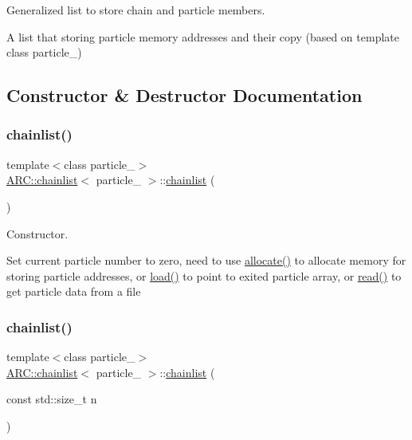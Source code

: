 Generalized list to store chain and particle members. 

A list that storing particle memory addresses and their copy (based on template class particle\+\_\+) 

\subsection{Constructor \& Destructor Documentation}
\hypertarget{classARC_1_1chainlist_a12641a795a63d6152c22fc4b363e28c1}{}\label{classARC_1_1chainlist_a12641a795a63d6152c22fc4b363e28c1} 
\subsubsection{\texorpdfstring{chainlist()}{chainlist()}\hspace{0.1cm}{\footnotesize\ttfamily [1/2]}}
{\footnotesize\ttfamily template$<$class particle\+\_\+$>$ \\
\hyperlink{classARC_1_1chainlist}{A\+R\+C\+::chainlist}$<$ particle\+\_\+ $>$\+::\hyperlink{classARC_1_1chainlist}{chainlist} (\begin{DoxyParamCaption}{ }\end{DoxyParamCaption})\hspace{0.3cm}{\ttfamily [inline]}}



Constructor. 

Set current particle number to zero, need to use \hyperlink{classARC_1_1chainlist_ab212df89ec5a2e81ce7525adc04001c1}{allocate()} to allocate memory for storing particle addresses, or \hyperlink{classARC_1_1chainlist_aa767ec18c7ed7372a1ef1a4b27a171c3}{load()} to point to exited particle array, or \hyperlink{classARC_1_1chainlist_adfa67e2ccdbdfd7ed945fa7617f90ecc}{read()} to get particle data from a file \hypertarget{classARC_1_1chainlist_a85e9f10829f11483253d992aceb901a2}{}\label{classARC_1_1chainlist_a85e9f10829f11483253d992aceb901a2} 
\subsubsection{\texorpdfstring{chainlist()}{chainlist()}\hspace{0.1cm}{\footnotesize\ttfamily [2/2]}}
{\footnotesize\ttfamily template$<$class particle\+\_\+$>$ \\
\hyperlink{classARC_1_1chainlist}{A\+R\+C\+::chainlist}$<$ particle\+\_\+ $>$\+::\hyperlink{classARC_1_1chainlist}{chainlist} (\begin{DoxyParamCaption}\item[{const std\+::size\+\_\+t}]{n }\end{DoxyParamCaption})\hspace{0.3cm}{\ttfamily [inline]}}



